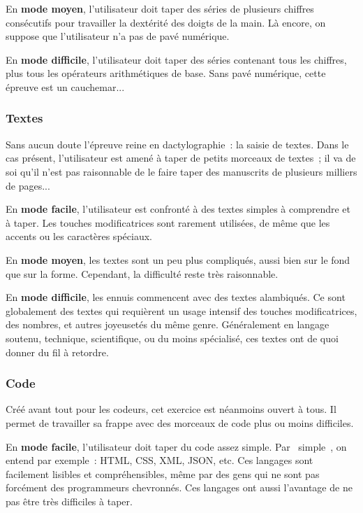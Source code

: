 \documentclass[a4paper,12pt]{article}
\begin{document}
En \textbf{mode moyen}, l'utilisateur doit taper des séries de plusieurs chiffres consécutifs pour travailler la dextérité des doigts de la main. Là encore, on suppose que l'utilisateur n'a pas de pavé numérique.

En \textbf{mode difficile}, l'utilisateur doit taper des séries contenant tous les chiffres, plus tous les opérateurs arithmétiques de base. Sans pavé numérique, cette épreuve est un cauchemar...

\subsubsection{Textes}

Sans aucun doute l'épreuve reine en dactylographie~: la saisie de textes. Dans le cas présent, l'utilisateur est amené à taper de petits morceaux de textes~; il va de soi qu'il n'est pas raisonnable de le faire taper des manuscrits de plusieurs milliers de pages...

En \textbf{mode facile}, l'utilisateur est confronté à des textes simples à comprendre et à taper. Les touches modificatrices sont rarement utilisées, de même que les accents ou les caractères spéciaux.

En \textbf{mode moyen}, les textes sont un peu plus compliqués, aussi bien sur le fond que sur la forme. Cependant, la difficulté reste très raisonnable.

En \textbf{mode difficile}, les ennuis commencent avec des textes alambiqués. Ce sont globalement des textes qui requièrent un usage intensif des touches modificatrices, des nombres, et autres joyeusetés du même genre. Généralement en langage soutenu, technique, scientifique, ou du moins spécialisé, ces textes ont de quoi donner du fil à retordre.

\subsubsection{Code}

Créé avant tout pour les codeurs, cet exercice est néanmoins ouvert à tous. Il permet de travailler sa frappe avec des morceaux de code plus ou moins difficiles.

En \textbf{mode facile}, l'utilisateur doit taper du code assez simple. Par \og~simple~\fg, on entend par exemple~: HTML, CSS, XML, JSON, etc. Ces langages sont facilement lisibles et compréhensibles, même par des gens qui ne sont pas forcément des programmeurs chevronnés. Ces langages ont aussi l'avantage de ne pas être très difficiles à taper.
\end{document}
